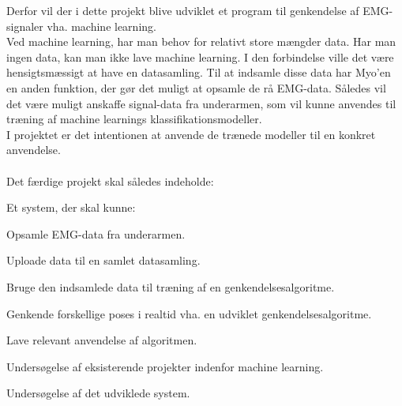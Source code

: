Derfor vil der i dette projekt blive udviklet et program til genkendelse af EMG-signaler vha. machine learning. \\
Ved machine learning, har man behov for relativt store mængder data. Har man ingen data, kan man ikke lave machine learning. I den forbindelse ville det være hensigtsmæssigt at have en datasamling. Til at indsamle disse data har Myo'en en anden funktion, der gør det muligt at opsamle de rå EMG-data. Således vil det være muligt anskaffe signal-data fra underarmen, som vil kunne anvendes til træning af machine learnings klassifikationsmodeller. \\
I projektet er det intentionen at anvende de trænede modeller til en konkret anvendelse. \\\\
Det færdige projekt skal således indeholde:
\begin{myItemize}
\item Et system, der skal kunne:
	\begin{myItemize}
		\item Opsamle EMG-data fra underarmen.
		\item Uploade data til en samlet datasamling.
		\item Bruge den indsamlede data til træning af en genkendelsesalgoritme.
		\item Genkende forskellige poses i realtid vha. en udviklet genkendelsesalgoritme.
		\item Lave relevant anvendelse af algoritmen.
	\end{myItemize}
\item Undersøgelse af eksisterende projekter indenfor machine learning.
\item Undersøgelse af det udviklede system.
\end{myItemize}
